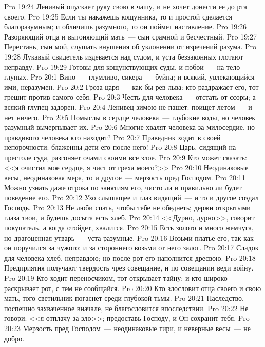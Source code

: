 \vs Pro 19:24 Ленивый опускает руку свою в чашу, и не хочет донести ее до рта своего.
\vs Pro 19:25 Если ты накажешь кощунника, то и простой сделается благоразумным; и  обличишь разумного, то он поймет наставление.
\vs Pro 19:26 Разоряющий отца и выгоняющий мать~--- сын срамной и бесчестный.
\vs Pro 19:27 Перестань, сын мой, слушать внушения об уклонении от изречений разума.
\vs Pro 19:28 Лукавый свидетель издевается над судом, и уста беззаконных глотают неправду.
\vs Pro 19:29 Готовы для кощунствующих суды, и побои~--- на тело глупых.
\vs Pro 20:1 Вино~--- глумливо, сикера~--- буйна; и всякий, увлекающийся ими, неразумен.
\vs Pro 20:2 Гроза царя~--- как бы рев льва: кто раздражает его, тот грешит против самого себя.
\vs Pro 20:3 Честь для человека~--- отстать от ссоры; а всякий глупец задорен.
\vs Pro 20:4 Ленивец зимою не пашет: поищет летом~--- и нет ничего.
\vs Pro 20:5 Помыслы в сердце человека~--- глубокие воды, но человек разумный вычерпывает их.
\vs Pro 20:6 Многие хвалят человека за милосердие, но правдивого человека кто находит?
\vs Pro 20:7 Праведник ходит в своей непорочности: блаженны дети его после него!
\vs Pro 20:8 Царь, сидящий на престоле суда, разгоняет очами своими все злое.
\vs Pro 20:9 Кто может сказать: <<я очистил мое сердце, я чист от греха моего?>>
\vs Pro 20:10 Неодинаковые весы, неодинаковая мера, то и другое~--- мерзость пред Господом.
\vs Pro 20:11 Можно узнать даже отрока по занятиям его, чисто ли и правильно ли будет поведение его.
\vs Pro 20:12 Ухо слышащее и глаз видящий~--- и то и другое создал Господь.
\vs Pro 20:13 Не люби спать, чтобы тебе не обеднеть; держи открытыми глаза твои, и будешь досыта есть хлеб.
\vs Pro 20:14 <<Дурно, дурно>>, говорит покупатель, а когда отойдет, хвалится.
\vs Pro 20:15 Есть золото и много жемчуга, но драгоценная утварь~--- уста разумные.
\vs Pro 20:16 Возьми платье его, так как он поручился за чужого; и за стороннего возьми от него залог.
\vs Pro 20:17 Сладок для человека хлеб,  неправдою; но после рот его наполнится дресвою.
\vs Pro 20:18 Предприятия получают твердость чрез совещание, и по совещании веди войну.
\vs Pro 20:19 Кто ходит переносчиком, тот открывает тайну; и кто широко раскрывает рот, с тем не сообщайся.
\vs Pro 20:20 Кто злословит отца своего и свою мать, того светильник погаснет среди глубокой тьмы.
\vs Pro 20:21 Наследство, поспешно захваченное вначале, не благословится впоследствии.
\vs Pro 20:22 Не говори: <<я отплачу за зло>>; предоставь Господу, и Он сохранит тебя.
\vs Pro 20:23 Мерзость пред Господом~--- неодинаковые гири, и неверные весы~--- не добро.
